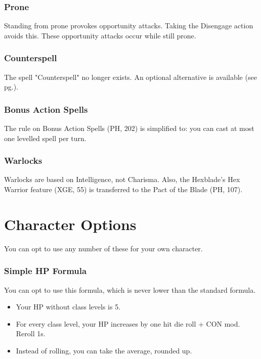 \documentclass[letterpaper,twocolumn,openany,nodeprecatedcode]{dndbook}
\newcommand{\pg}[1]{pg.\pageref{#1}}
\newcommand{\see}[1]{(see \pg{#1})}
\begin{document}
\subsection{Prone}
Standing from prone provokes opportunity attacks. Taking the Disengage action avoids this.
These opportunity attacks occur while still prone.

\subsection{Counterspell}
The spell "Counterspell" no longer exists. An optional alternative is available \see{counterspell}.

\subsection{Bonus Action Spells}
The rule on Bonus Action Spells (PH, 202) is simplified to: you can cast at most one levelled spell per turn.

\subsection{Warlocks}
Warlocks are based on Intelligence, not Charisma. Also, the Hexblade's Hex Warrior feature (XGE, 55) is transferred to the Pact of the Blade (PH, 107).










\chapter{Character Options}
\noindent You can opt to use any number of these for your own character.

\subsection{Simple HP Formula}
You can opt to use this formula, which is never lower than the standard formula.
\begin{itemize}
\item Your HP without class levels is 5.
\item For every class level, your HP increases by one hit die roll + CON mod. Reroll 1s. 
\item Instead of rolling, you can take the average, rounded up.
\end{itemize}
\end{document}
